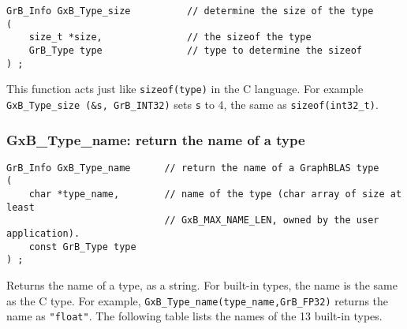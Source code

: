\documentclass[12pt]{article}
\begin{document}
\begin{mdframed}[userdefinedwidth=6in]
{\footnotesize
\begin{verbatim}
GrB_Info GxB_Type_size          // determine the size of the type
(
    size_t *size,               // the sizeof the type
    GrB_Type type               // type to determine the sizeof
) ;
\end{verbatim}
}\end{mdframed}

This function acts just like \verb'sizeof(type)' in the C language.  For
example \verb'GxB_Type_size (&s, GrB_INT32)' sets \verb's' to 4, the same as
\verb'sizeof(int32_t)'.

\newpage
\subsubsection{{\sf GxB\_Type\_name:} return the name of a type}
\label{type_name}

\begin{mdframed}[userdefinedwidth=6in]
{\footnotesize
\begin{verbatim}
GrB_Info GxB_Type_name      // return the name of a GraphBLAS type
(
    char *type_name,        // name of the type (char array of size at least
                            // GxB_MAX_NAME_LEN, owned by the user application).
    const GrB_Type type
) ;
\end{verbatim}
}\end{mdframed}

Returns the name of a type, as a string.  For built-in types, the name is
the same as the C type.  For example, \verb'GxB_Type_name(type_name,GrB_FP32)'
returns the name as \verb'"float"'.  The following table lists the
names of the 13 built-in types.
\end{document}
